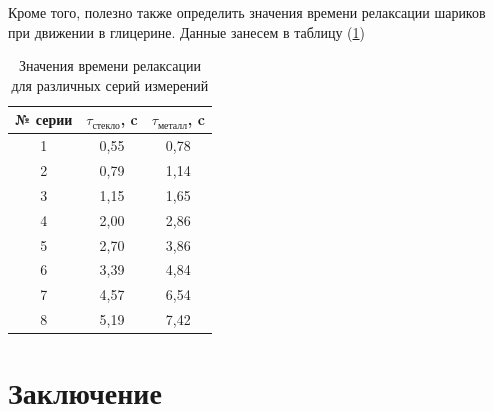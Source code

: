 \documentclass[a4paper, 12pt]{article}%
\begin{document}
Кроме того, полезно также определить значения времени релаксации шариков при движении в глицерине. Данные занесем в таблицу (\ref{tab:relax_time})

\begin{table}[h!]
\centering
\begin{tabular}{|c|c|c|}
\hline
№ серии & $\tau_{\text{стекло}}$, c & $\tau_{\text{металл}}$, c \\ \hline
1       & 0,55                   & 0,78                  \\ \hline
2       & 0,79                   & 1,14                  \\ \hline
3       & 1,15                   & 1,65                  \\ \hline
4       & 2,00                   & 2,86                  \\ \hline
5       & 2,70                   & 3,86                  \\ \hline
6       & 3,39                   & 4,84                  \\ \hline
7       & 4,57                   & 6,54                  \\ \hline
8       & 5,19                   & 7,42                  \\ \hline
\end{tabular}
\caption{Значения времени релаксации для различных серий измерений}
\label{tab:relax_time}
\end{table}
\newpage
\section{Заключение}
\end{document}
